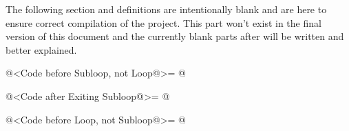 
The following section and definitions are intentionally blank and are
here to ensure correct compilation of the project. This part won't
exist in the final version of this document and the currently blank
parts after will be written and better explained.

\iniciocodigo
@<Code before Subloop, not Loop@>= @
\fimcodigo

\iniciocodigo
@<Code after Exiting Subloop@>= @
\fimcodigo

\iniciocodigo
@<Code before Loop, not Subloop@>= @
\fimcodigo






\fim
